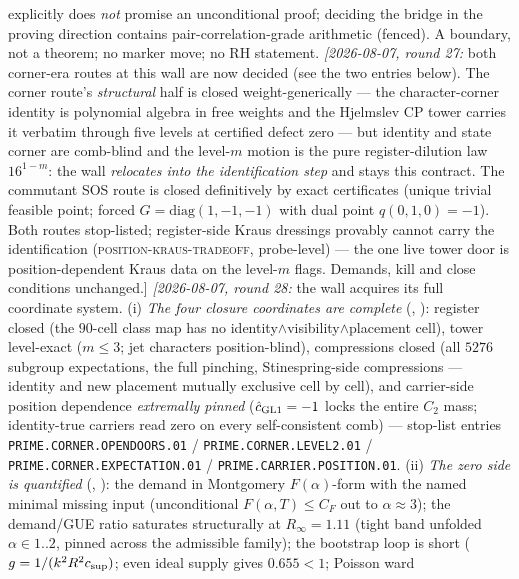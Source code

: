 {explicitly does \emph{not} promise an unconditional proof;
deciding the bridge in the proving direction contains
pair-correlation-grade arithmetic (fenced).  A boundary, not a
theorem; no marker move; no RH statement.
\emph{[2026-08-07, round 27:} both corner-era routes at this wall
are now decided (see the two entries below).  The corner route's
\emph{structural} half is closed weight-generically --- the
character-corner identity is polynomial algebra in free weights
and the Hjelmslev CP tower carries it verbatim through five
levels at certified defect zero --- but identity and state corner
are comb-blind and the level-$m$ motion is the pure
register-dilution law $16^{1-m}$: the wall \emph{relocates into
the identification step} and stays this contract.  The commutant
SOS route is closed definitively by exact certificates (unique
trivial feasible point; forced $G = \mathrm{diag}(1,-1,-1)$ with
dual point $q(0,1,0) = -1$).  Both routes stop-listed;
register-side Kraus dressings provably cannot carry the
identification (\textsc{position-kraus-tradeoff}, probe-level) ---
the one live tower door is position-dependent Kraus data on the
level-$m$ flags.  Demands, kill and close conditions
unchanged.]
\emph{[2026-08-07, round 28:} the wall acquires its full
coordinate system.  (i) \emph{The four closure coordinates are
complete} (,
): register closed
(the $90$-cell class map has no
identity$\wedge$visibility$\wedge$placement cell), tower
level-exact ($m \le 3$; jet characters position-blind),
compressions closed (all $5276$ subgroup expectations, the full
pinching, Stinespring-side compressions --- identity and new
placement mutually exclusive cell by cell), and carrier-side
position dependence \emph{extremally pinned}
($\hat c_{\rm GL1} = -1$ locks the entire $C_2$ mass;
identity-true carriers read zero on every self-consistent comb)
--- stop-list entries \texttt{PRIME.CORNER.OPENDOORS.01} /
\texttt{PRIME.CORNER.LEVEL2.01} /
\texttt{PRIME.CORNER.EXPECTATION.01} /
\texttt{PRIME.CARRIER.POSITION.01}.  (ii) \emph{The zero side is
quantified} (,
): the demand in Montgomery
$F(\alpha)$-form with the named minimal missing input
(unconditional $F(\alpha, T) \le C_F$ out to $\alpha \approx 3$);
the demand/GUE ratio saturates structurally at $R_\infty = 1.11$
(tight band unfolded $\alpha \in 1..2$, pinned across the
admissible family); the bootstrap loop is short ($g = 1/(k^2 R^2
c_{\rm sup})$; even ideal supply gives $0.655 < 1$; Poisson ward
}
